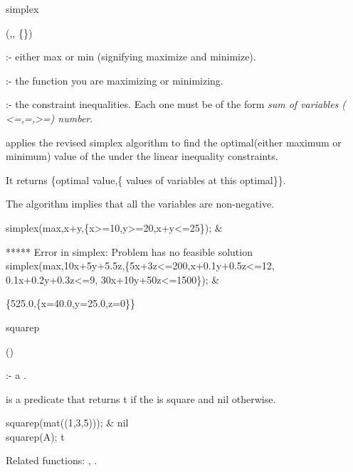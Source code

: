 \begin{Operator}{simplex}

\begin{Syntax}
(,,
\{\})
\end{Syntax}

             :- either max or min (signifying maximize and
			      minimize).

  :- the function you are maximizing or
			      minimizing.

 :- the constraint inequalities. Each one must
                              be of the form {\it sum of variables (
                              <=,=,>=) number}.

 applies the revised simplex algorithm to find the 
optimal(either maximum or minimum) value of the 
 under the linear inequality constraints.

It returns \{optimal value,\{ values of variables at this optimal\}\}.

The algorithm implies that all the variables are non-negative.

\begin{Examples}

 simplex(max,x+y,\{x>=10,y>=20,x+y<=25\}); &

 ***** Error in simplex: Problem has no feasible solution\\

simplex(max,10x+5y+5.5z,\{5x+3z<=200,x+0.1y+0.5z<=12,
0.1x+0.2y+0.3z<=9, 30x+10y+50z<=1500\}); &

\{525.0,\{x=40.0,y=25.0,z=0\}\}\\

\end{Examples}

\end{Operator}


\begin{Operator}{squarep}

\begin{Syntax}
()
\end{Syntax}
 
 :- a .

 is a predicate that returns t if the  is 
square and nil otherwise.

\begin{Examples}

squarep(mat((1,3,5))); &
nil \\
squarep(A);
t\\

\end{Examples}

Related functions: , .

\end{Operator}


